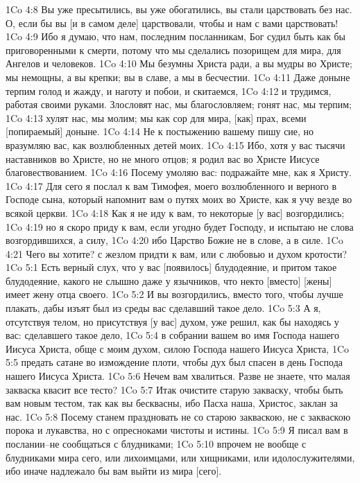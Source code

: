 1Co 4:8  Вы уже пресытились, вы уже обогатились, вы стали царствовать без нас. О, если бы вы [и в самом деле] царствовали, чтобы и нам с вами царствовать!
1Co 4:9  Ибо я думаю, что нам, последним посланникам, Бог судил быть как бы приговоренными к смерти, потому что мы сделались позорищем для мира, для Ангелов и человеков.
1Co 4:10  Мы безумны Христа ради, а вы мудры во Христе; мы немощны, а вы крепки; вы в славе, а мы в бесчестии.
1Co 4:11  Даже доныне терпим голод и жажду, и наготу и побои, и скитаемся,
1Co 4:12  и трудимся, работая своими руками. Злословят нас, мы благословляем; гонят нас, мы терпим;
1Co 4:13  хулят нас, мы молим; мы как сор для мира, [как] прах, всеми [попираемый] доныне.
1Co 4:14  Не к постыжению вашему пишу сие, но вразумляю вас, как возлюбленных детей моих.
1Co 4:15  Ибо, хотя у вас тысячи наставников во Христе, но не много отцов; я родил вас во Христе Иисусе благовествованием.
1Co 4:16  Посему умоляю вас: подражайте мне, как я Христу.
1Co 4:17  Для сего я послал к вам Тимофея, моего возлюбленного и верного в Господе сына, который напомнит вам о путях моих во Христе, как я учу везде во всякой церкви.
1Co 4:18  Как я не иду к вам, то некоторые [у вас] возгордились;
1Co 4:19  но я скоро приду к вам, если угодно будет Господу, и испытаю не слова возгордившихся, а силу,
1Co 4:20  ибо Царство Божие не в слове, а в силе.
1Co 4:21  Чего вы хотите? с жезлом придти к вам, или с любовью и духом кротости?
1Co 5:1  Есть верный слух, что у вас [появилось] блудодеяние, и притом такое блудодеяние, какого не слышно даже у язычников, что некто [вместо] [жены] имеет жену отца своего.
1Co 5:2  И вы возгордились, вместо того, чтобы лучше плакать, дабы изъят был из среды вас сделавший такое дело.
1Co 5:3  А я, отсутствуя телом, но присутствуя [у вас] духом, уже решил, как бы находясь у вас: сделавшего такое дело,
1Co 5:4  в собрании вашем во имя Господа нашего Иисуса Христа, обще с моим духом, силою Господа нашего Иисуса Христа,
1Co 5:5  предать сатане во измождение плоти, чтобы дух был спасен в день Господа нашего Иисуса Христа.
1Co 5:6  Нечем вам хвалиться. Разве не знаете, что малая закваска квасит все тесто?
1Co 5:7  Итак очистите старую закваску, чтобы быть вам новым тестом, так как вы бесквасны, ибо Пасха наша, Христос, заклан за нас.
1Co 5:8  Посему станем праздновать не со старою закваскою, не с закваскою порока и лукавства, но с опресноками чистоты и истины.
1Co 5:9  Я писал вам в послании--не сообщаться с блудниками;
1Co 5:10  впрочем не вообще с блудниками мира сего, или лихоимцами, или хищниками, или идолослужителями, ибо иначе надлежало бы вам выйти из мира [сего].

